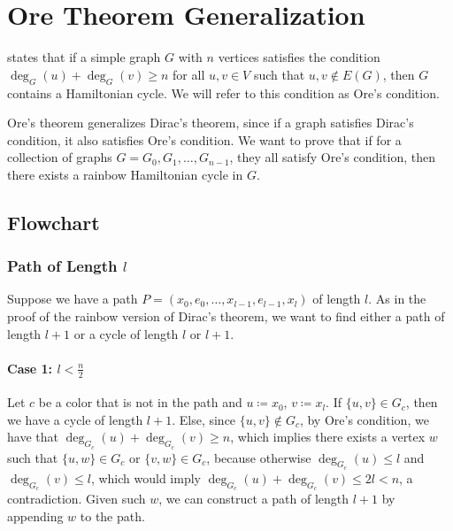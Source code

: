 
\chapter{Ore Theorem Generalization}

\cite{Ore_1960} states that if a simple graph $G$ with $n$ vertices satisfies the condition
$\deg_G(u) + \deg_G(v) \geq n$ for all $u, v \in V$ such that ${u, v} \not\in E(G)$, then $G$ contains a Hamiltonian cycle.
We will refer to this condition as Ore's condition.

Ore's theorem generalizes Dirac's theorem, since if a graph satisfies Dirac's condition, it also satisfies Ore's condition.
We want to prove that if for a collection of graphs $G = {G_0, G_1, \ldots, G_{n-1}}$, they all satisfy Ore's condition,
then there exists a rainbow Hamiltonian cycle in $G$.

\section{Flowchart}

\subsection{Path of Length $l$}

Suppose we have a path $ P = (x_0, e_0, \dots, x_{l-1}, e_{l-1}, x_{l}) $ of length $ l $.
As in the proof of the rainbow version of Dirac's theorem,
we want to find either a path of length $ l+1 $ or a cycle of length $ l $ or $ l+1 $.

\subsubsection{Case 1: \( l < \frac{n}{2} \)}

Let \( c \) be a color that is not in the path and \(u \coloneqq x_0\), \(v \coloneqq x_{l}\). 
If \( \{u, v\} \in G_c \), then we have a cycle of length \( l+1 \).
Else, since \( \{u, v\} \not\in G_c \), by Ore's condition, 
we have that \( \deg_{G_c}(u) + \deg_{G_c}(v) \geq n \), which implies there exists a 
vertex \( w \) such that \( \{u, w\} \in G_c \) or \( \{v, w\} \in G_c \), because otherwise
\( \deg_{G_c}(u) \leq l  \) and \( \deg_{G_c}(v) \leq l \), 
which would imply \( \deg_{G_c}(u) + \deg_{G_c}(v) \leq 2l < n \), a contradiction.
Given such \(w\), we can construct a path of length \( l+1 \) by appending \(w\) to the path.

